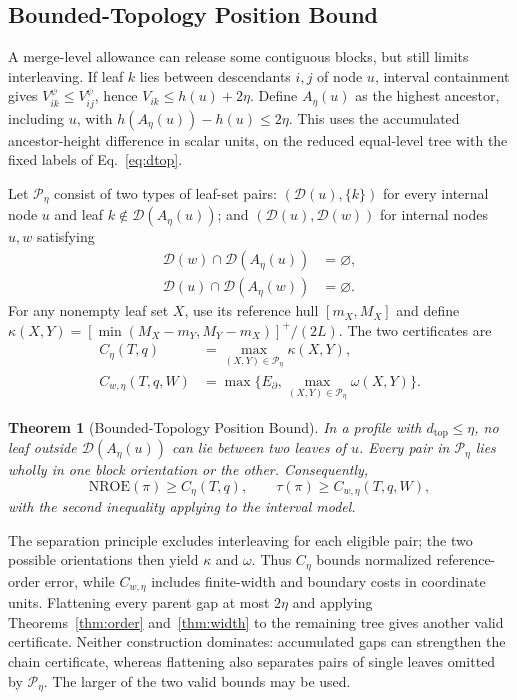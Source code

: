\documentclass[review]{vgtc}
\newtheorem{theorem}{Theorem}
\newcommand{\dtop}{d_{\mathrm{top}}}
\newcommand{\nroe}{\mathrm{NROE}}
\begin{document}
\subsection{Bounded-Topology Position Bound}
A merge-level allowance can release some contiguous blocks, but still limits interleaving. If leaf $k$ lies between descendants $i,j$ of node $u$, interval containment gives $V_{ik}^{\psi}\le V_{ij}^{\psi}$, hence $V_{ik}\le h(u)+2\eta$. Define $A_\eta(u)$ as the highest ancestor, including $u$, with $h(A_\eta(u))-h(u)\le2\eta$. This uses the accumulated ancestor-height difference in scalar units, on the reduced equal-level tree with the fixed labels of Eq.~\ref{eq:dtop}.

Let $\mathcal{P}_\eta$ consist of two types of leaf-set pairs: $(\mathcal{D}(u),\{k\})$ for every internal node $u$ and leaf $k\notin\mathcal{D}(A_\eta(u))$; and $(\mathcal{D}(u),\mathcal{D}(w))$ for internal nodes $u,w$ satisfying
\begin{equation}\label{eq:separatedpairs}
\begin{aligned}
 \mathcal{D}(w)\cap\mathcal{D}(A_\eta(u))&=\varnothing,\\
 \mathcal{D}(u)\cap\mathcal{D}(A_\eta(w))&=\varnothing.
\end{aligned}
\end{equation}
For any nonempty leaf set $X$, use its reference hull $[m_X,M_X]$ and define $\kappa(X,Y)=[\min(M_X-m_Y,M_Y-m_X)]^+/(2L)$. The two certificates are
\begin{equation}\label{eq:chaindef}
\begin{aligned}
 C_\eta(T,q)&=\max_{(X,Y)\in\mathcal{P}_\eta}\kappa(X,Y),\\
 C_{w,\eta}(T,q,W)&=\max\{E_\partial,\max_{(X,Y)\in\mathcal{P}_\eta}\omega(X,Y)\}.
\end{aligned}
\end{equation}
\begin{theorem}[Bounded-Topology Position Bound]\label{thm:chain}
In a profile with $\dtop\le\eta$, no leaf outside $\mathcal{D}(A_\eta(u))$ can lie between two leaves of $u$. Every pair in $\mathcal{P}_\eta$ lies wholly in one block orientation or the other. Consequently,
\begin{equation}\label{eq:chainbounds}
 \nroe(\pi)\ge C_\eta(T,q),\qquad
 \tau(\pi)\ge C_{w,\eta}(T,q,W),
\end{equation}
with the second inequality applying to the interval model.
\end{theorem}
The separation principle excludes interleaving for each eligible pair; the two possible orientations then yield $\kappa$ and $\omega$. Thus $C_\eta$ bounds normalized reference-order error, while $C_{w,\eta}$ includes finite-width and boundary costs in coordinate units. Flattening every parent gap at most $2\eta$ and applying Theorems~\ref{thm:order} and~\ref{thm:width} to the remaining tree gives another valid certificate. Neither construction dominates: accumulated gaps can strengthen the chain certificate, whereas flattening also separates pairs of single leaves omitted by $\mathcal{P}_\eta$. The larger of the two valid bounds may be used.
\end{document}
